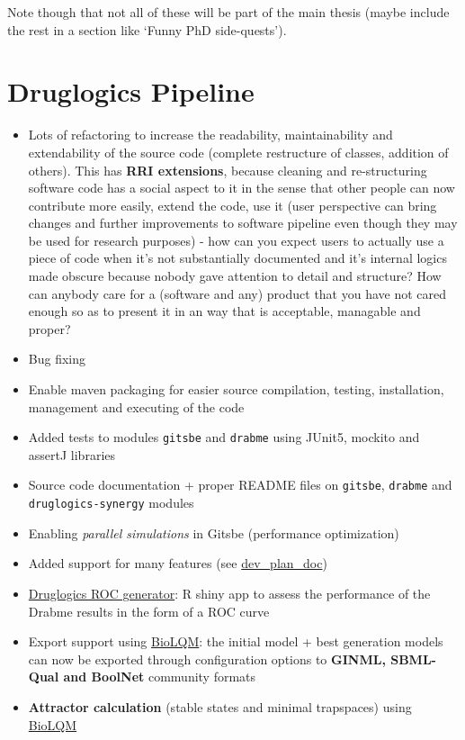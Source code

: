 \documentclass[
  12pt,
]{book}
\providecommand{\tightlist}{%
  \setlength{\itemsep}{0pt}\setlength{\parskip}{0pt}}
\begin{document}
Note though that not all of these will be part of the main thesis (maybe include the
rest in a section like `Funny PhD side-quests').

\hypertarget{dlpipe}{%
\section{Druglogics Pipeline}\label{dlpipe}}

\begin{itemize}
\tightlist
\item
  Lots of refactoring to increase the readability, maintainability and
  extendability of the source code (complete restructure of classes, addition of
  others).
  This has \textbf{RRI extensions}, because cleaning and re-structuring software code has a social aspect to it in the sense that other people can now contribute more easily, extend the code, use it (user perspective can bring changes and further improvements to software pipeline even though they may be used for research purposes) - how can you expect users to actually use a piece of code when it's not substantially documented and it's internal logics made obscure because nobody gave attention to detail and structure? How can anybody care for a (software and any) product that you have not cared enough so as to present it in an way that is acceptable, managable and proper?
\item
  Bug fixing
\item
  Enable maven packaging for easier source compilation, testing,
  installation, management and executing of the code
\item
  Added tests to modules \texttt{gitsbe} and \texttt{drabme} using JUnit5, mockito and assertJ libraries
\item
  Source code documentation + proper README files on \texttt{gitsbe}, \texttt{drabme} and \texttt{druglogics-synergy} modules
\item
  Enabling \emph{parallel simulations} in Gitsbe (performance optimization)
\item
  Added support for many features (see \href{https://docs.google.com/document/d/1OUupR0b-28YB9pVAww77RMecnFN6A39MYjXMjljmvG4/edit?usp=sharing}{dev\_plan\_doc})
\item
  \href{https://github.com/bblodfon/druglogics-roc}{Druglogics ROC generator}:
  R shiny app to assess the performance of the Drabme results in the form of a
  ROC curve
\item
  Export support using \href{https://github.com/colomoto/bioLQM}{BioLQM}: the initial model + best generation models can now be exported through configuration options to \textbf{GINML, SBML-Qual and BoolNet} community formats
\item
  \textbf{Attractor calculation} (stable states and minimal trapspaces) using \href{https://github.com/colomoto/bioLQM}{BioLQM}
\end{itemize}
\end{document}

